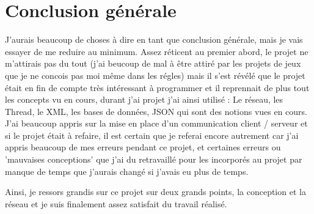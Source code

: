 \documentclass[12pt, openany]{report}
\begin{document}
    \section{Conclusion générale}
J'aurais beaucoup de choses à dire en tant que conclusion générale, mais je vais essayer de me reduire au minimum. Assez réticent au premier abord, le projet ne m'attirais pas du tout (j'ai beucoup de mal à être attiré par les projets de jeux que je ne concois pas moi même dans les régles) mais il s'est révélé que le projet était en fin de compte très intéressant à programmer et il reprennait de plus tout les concepts vu en cours, durant j'ai projet j'ai ainsi utilisé : Le réseau, les Thread, le XML, les bases de données, JSON qui sont des notions vues en cours. J'ai beaucoup appris sur la mise en place d'un communication client / serveur et si le projet était à refaire, il est certain que je referai encore autrement car j'ai appris beaucoup de mes erreurs pendant ce projet, et certaines erreurs ou 'mauvaises conceptions' que j'ai du retravaillé pour les incorporés au projet par manque de temps que j'aurais changé si j'avais eu plus de temps.

Ainsi, je ressors grandis sur ce projet sur deux grands points, la conception et la réseau et je suis finalement assez satisfait du travail réalisé.
\end{document}
